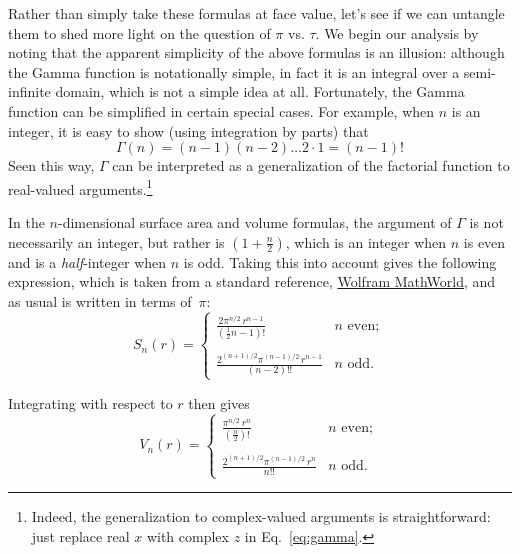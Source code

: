 {Rather than simply take these formulas at face value, let's see if we can untangle them to shed more light on the question of $\pi$ vs. $\tau$. We begin our analysis by noting that the apparent simplicity of the above formulas is an illusion: although the Gamma function is notationally simple, in fact it is an integral over a semi-infinite domain, which is not a simple idea at all. Fortunately, the Gamma function can be simplified in certain special cases. For example, when $n$ is an integer, it is easy to show (using integration by parts) that
\[
\Gamma(n) = (n-1)(n-2)\ldots 2\cdot 1 = (n-1)!
\]
Seen this way, $\Gamma$ can be interpreted as a generalization of the factorial function to real-valued arguments.\footnote{Indeed, the generalization to complex-valued arguments is straightforward: just replace real $x$ with complex $z$ in Eq.~\eqref{eq:gamma}.}

In the $n$-dimensional surface area and volume formulas, the argument of $\Gamma$ is not necessarily an integer, but rather is $\left(1 + \frac{n}{2}\right)$, which is an integer when $n$ is even and is a \emph{half}-integer when $n$ is odd. Taking this into account gives the following expression, which is taken from a standard reference, \href{https://mathworld.wolfram.com/Hypersphere.html}{Wolfram MathWorld}, and as usual is written in terms of~$\pi$:
\begin{equation}
\label{eq:surface_area_mathworld}
S_n(r) = \begin{cases}
\displaystyle \frac{2\pi^{n/2}\,r^{n-1}}{(\frac{1}{2}n - 1)!} & n \text{ even}; \\ \\
 \displaystyle \frac{2^{(n+1)/2}\pi^{(n-1)/2}\,r^{n-1}}{(n-2)!!} & n \text{ odd}.
\end{cases}
\end{equation}

Integrating with respect to $r$ then gives
\begin{equation}
\label{eq:volume_mathworld}
V_n(r) = \begin{cases}
\displaystyle \frac{\pi^{n/2}\,r^n}{(\frac{n}{2})!} & n \text{ even}; \\ \\
\displaystyle \frac{2^{(n+1)/2}\pi^{(n-1)/2}\,r^n}{n!!} & n \text{ odd}.
\end{cases}
\end{equation}

}
